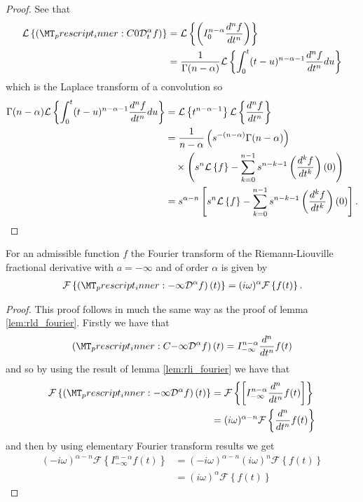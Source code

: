 \begin{proof}
    See that
    \begin{align}
        \laplace{\capder{0}{t}{\alpha}{f}} &= \laplace{  \rli{0}{n-\alpha}{\der{f}{t}{n}}} \\
            &= \frac{1}{\Gamma(n-\alpha)}\laplace{ \int_0^t (t-u)^{n-\alpha-1} \der{f}{t}{n} du} \\ 
    \end{align}
    which is the Laplace transform of a convolution so
    \begin{align}
        \Gamma(n-\alpha)\mathcal{L} \left\{  \int_0^t (t-u)^{n-\alpha-1} \frac{d^{n}f}{dt^{n}} du \right\} &= \mathcal{L} \left\{ t^{n-\alpha-1} \right\} \mathcal{L} \left\{ \frac{d^{n}f}{dt^{n}} \right\} \\
        &= \frac{1}{n-\alpha} \left( s^{-(n-\alpha)} \Gamma(n-\alpha) \right) \\
        & \ \ \ \times \left( s^n \mathcal{L} \left\{ f \right\} - \sum_{k=0}^{n-1} s^{n-k-1} \left( \frac{d^{k}f}{dt^{k}} \right)(0) \right) \\
        &= s^{\alpha - n} \left[ s^n \mathcal{L} \left\{ f \right\} - \sum_{k=0}^{n-1} s^{n-k-1} \left( \frac{d^{k}f}{dt^{k}} \right)(0) \right].
    \end{align}
\end{proof}
\begin{mdframed}[innertopmargin=10pt]
\begin{lemma}
    \label{lem:cap_fourier}
    For an admissible function $ f $ the Fourier transform of the Riemann-Liouville fractional derivative with $ a = -\infty $ and of order $ \alpha $ is given by
    \begin{align}
        \mathcal{F}\left\{ \left(\prescript{}{-\infty}{\mathcal{D}}^\alpha f\right)(t) \right\} = (i\omega)^{\alpha} \mathcal{F}\left\{ f(t) \right\}.
    \end{align}
\end{lemma}
\end{mdframed}
\begin{proof}
This proof follows in much the same way as the proof of lemma \ref{lem:rld_fourier}.
Firstly we have that
    \begin{align}
        \left(\prescript{C}{-\infty}{\mathcal{D}}^\alpha f\right)(t) =  I_{-\infty}^{n - \alpha} \frac{d^n}{dt^n}f(t)
    \end{align}
    and so by using the result of lemma \ref{lem:rli_fourier} we have that
    \begin{align}
        \mathcal{F}\left\{ \left(\prescript{}{-\infty}{\mathcal{D}}^\alpha f\right)(t) \right\}  &=
        \mathcal{F}\left\{ \left[ I_{-\infty}^{n-\alpha} \frac{d^n}{dt^n}f(t) \right] \right\} \\
        &= (i\omega)^{\alpha - n} \mathcal{F}\left\{ \frac{d^n}{dt^n}f(t) \right\}
    \end{align}
    and then by using elementary Fourier transform results we get
    \begin{align}
        (-i\omega)^{\alpha -n} \mathcal{F}\left\{ I_{-\infty}^{n-\alpha} f(t) \right\} &= (-i\omega)^{\alpha - n}(i\omega)^{n}\mathcal{F}\left\{ f(t)\right\} \\
        &= (i\omega)^\alpha  \mathcal{F}\left\{ f(t) \right\}
    \end{align}
\end{proof}

